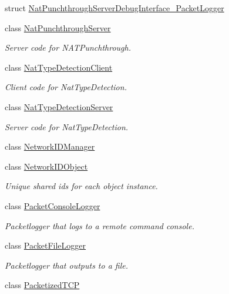 \begin{DoxyCompactItemize}
\item 
struct \hyperlink{struct_rak_net_1_1_nat_punchthrough_server_debug_interface___packet_logger}{Nat\-Punchthrough\-Server\-Debug\-Interface\-\_\-\-Packet\-Logger}
\item 
class \hyperlink{class_rak_net_1_1_nat_punchthrough_server}{Nat\-Punchthrough\-Server}
\begin{DoxyCompactList}\small\item\em Server code for N\-A\-T\-Punchthrough. \end{DoxyCompactList}\item 
class \hyperlink{class_rak_net_1_1_nat_type_detection_client}{Nat\-Type\-Detection\-Client}
\begin{DoxyCompactList}\small\item\em Client code for Nat\-Type\-Detection. \end{DoxyCompactList}\item 
class \hyperlink{class_rak_net_1_1_nat_type_detection_server}{Nat\-Type\-Detection\-Server}
\begin{DoxyCompactList}\small\item\em Server code for Nat\-Type\-Detection. \end{DoxyCompactList}\item 
class \hyperlink{class_rak_net_1_1_network_i_d_manager}{Network\-I\-D\-Manager}
\item 
class \hyperlink{class_rak_net_1_1_network_i_d_object}{Network\-I\-D\-Object}
\begin{DoxyCompactList}\small\item\em Unique shared ids for each object instance. \end{DoxyCompactList}\item 
class \hyperlink{class_rak_net_1_1_packet_console_logger}{Packet\-Console\-Logger}
\begin{DoxyCompactList}\small\item\em Packetlogger that logs to a remote command console. \end{DoxyCompactList}\item 
class \hyperlink{class_rak_net_1_1_packet_file_logger}{Packet\-File\-Logger}
\begin{DoxyCompactList}\small\item\em Packetlogger that outputs to a file. \end{DoxyCompactList}\item 
class \hyperlink{class_rak_net_1_1_packetized_t_c_p}{Packetized\-T\-C\-P}
\item 

\end{DoxyCompactItemize}

